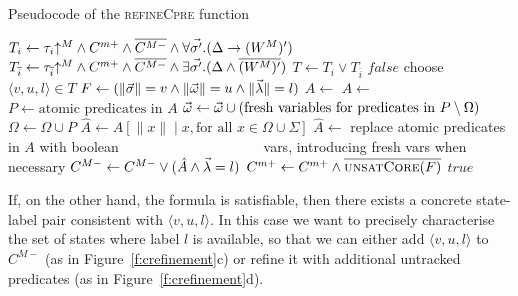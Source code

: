 \begin{algorithm}[t]

\caption{Pseudocode of the \textsc{refineCpre} function}
\label{alg:refineCpre}
\begin{algorithmic}[1]
    \State {}
    \State $T_i         \gets \tau_i\mathord{\uparrow^M} \land C^{m+} 
    \land {\overline{C^{M-}}} \land \forall \vec{\sigma'}. (\Delta \rightarrow (W^M)')$
    \State {}
    \State $T_{\overline{i}} \gets \tau_{\overline{i}}\mathord{\uparrow^M} \land C^{m+} \land {\overline{C^{M-}}} \land \exists \vec{\sigma'}. (\Delta \land \overline{(W^M)'})$
    \State $T           \gets T_i \lor T_{\overline{i}}$
        \Return $false$ 
    \Else
        \State choose $\langle v,u,l\rangle \in T$
        \State $F \gets (\|\vec{\sigma}\|=v \land \|\vec{\omega}\|=u \land \|\vec{\lambda}\|=l)$
         \label{a:refineCpre:sat}
            \State $A             \gets $  \label{a:refineCpre:quant}
            \State $A             \gets $ 
            \State $P             \gets \text{atomic predicates in }A$
            \State $\vec{\omega} \gets \vec{\omega} \cup (\text{fresh variables for predicates in } P\setminus\Omega)$
            \State $\Omega        \gets \Omega \cup P$
            \State $\hat{A}       \gets A[\|x\|\mid x, \text{for all } x\in\Omega \cup \Sigma ]$
            \State $\hat{A}       \gets$ replace atomic predicates in $A$ with boolean
            \Statex  ~~~~~~~~~~~~~~~~~~~~vars, introducing fresh vars when necessary
            \State $C^{M-}        \gets C^{M-} \lor (\hat{A}\land \vec{\lambda}=l)$%
        \Else
            \State $C^{m+}\gets C^{m+} \land \overline{\textsc{unsatCore}(F)}$ \label{a:refineCpre:core}%
        \EndIf
        \State \Return $true$
    \EndIf
\EndFunction
\end{algorithmic}
\end{algorithm}

If, on the other hand, the formula is satisfiable, then there exists a concrete state-label pair consistent with $\langle v,u,l\rangle$.  In this case we want to precisely characterise the set of states where label $l$ is available, so that we can either add $\langle v,u,l\rangle$ to $C^{M-}$ (as in Figure~\ref{f:crefinement}c) or refine it with additional untracked predicates (as in Figure~\ref{f:crefinement}d).

